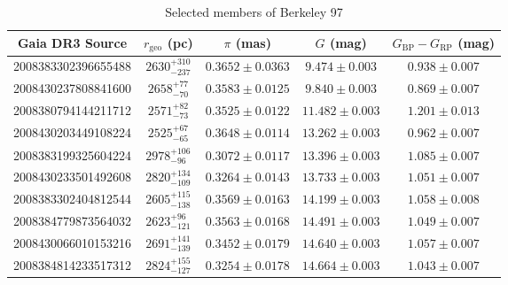 \begin{table*}[h]
\caption{Selected members of Berkeley 97}
\label{tab:Berkeley_97_members}
\begin{tabular}{ccccc}
\hline
Gaia DR3 Source & $r_{\text{geo}}$ (pc) & $\pi$ (mas) & $G$ (mag) & $G_{\text{BP}}-G_{\text{RP}}$ (mag) \\
\hline
2008383302396655488 & $2630^{+310}_{-237}$ & $0.3652\pm0.0363$ & $9.474\pm0.003$ & $0.938\pm0.007$ \\
2008430237808841600 & $2658^{+77}_{-70}$ & $0.3583\pm0.0125$ & $9.840\pm0.003$ & $0.869\pm0.007$ \\
2008380794144211712 & $2571^{+82}_{-73}$ & $0.3525\pm0.0122$ & $11.482\pm0.003$ & $1.201\pm0.013$ \\
2008430203449108224 & $2525^{+67}_{-65}$ & $0.3648\pm0.0114$ & $13.262\pm0.003$ & $0.962\pm0.007$ \\
2008383199325604224 & $2978^{+106}_{-96}$ & $0.3072\pm0.0117$ & $13.396\pm0.003$ & $1.085\pm0.007$ \\
2008430233501492608 & $2820^{+134}_{-109}$ & $0.3264\pm0.0143$ & $13.733\pm0.003$ & $1.051\pm0.007$ \\
2008383302404812544 & $2605^{+115}_{-138}$ & $0.3569\pm0.0163$ & $14.199\pm0.003$ & $1.058\pm0.008$ \\
2008384779873564032 & $2623^{+96}_{-121}$ & $0.3563\pm0.0168$ & $14.491\pm0.003$ & $1.049\pm0.007$ \\
2008430066010153216 & $2691^{+141}_{-139}$ & $0.3452\pm0.0179$ & $14.640\pm0.003$ & $1.057\pm0.007$ \\
2008384814233517312 & $2824^{+155}_{-127}$ & $0.3254\pm0.0178$ & $14.664\pm0.003$ & $1.043\pm0.007$ \\
\hline
\end{tabular}
\end{table*}

